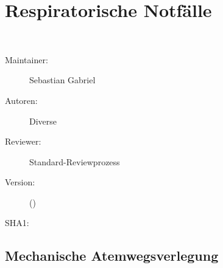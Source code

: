 

% 

\chapter
[\CO{[RSP]} Respiratorische Notfälle]
{\CC{[RSP]} Respiratorische Notfälle}
\label{topic:respiratorische-notfaelle}
\ChapterIntro
{%
~~~
}
{%
\begin{description}
  \item[Maintainer:] Sebastian Gabriel
  \item[Autoren:] Diverse
  \item[Reviewer:] Standard-Reviewprozess
  \item[Version:] {\DocVersion} ({\DocVersionInfo})
  \item[SHA1:] {\DocGitCommit}
\end{description}

{\TxTeilkapitelAASS}
}

% 




\section{Mechanische Atemwegsverlegung}
\label{topic:mechanische-atemwegsverlegung}
\label{topic:fremdkoerperaspiration}

